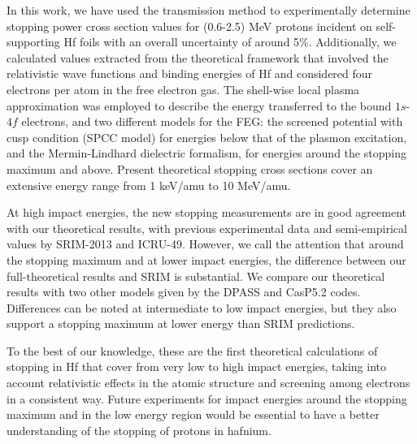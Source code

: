 In this work, we have used the transmission method to experimentally 
determine stopping power cross section values for (0.6-2.5) MeV protons 
incident on self-supporting Hf foils with an overall uncertainty of 
around 5\%. Additionally, we calculated values extracted from the 
theoretical framework that involved the relativistic wave functions and 
binding energies of Hf and considered four electrons per atom in the 
free electron gas. The shell-wise local plasma approximation was 
employed to describe the energy transferred to the bound $1s$-$4f$ 
electrons, and two different models for the FEG: the screened potential 
with cusp condition (SPCC model) for energies below that of the plasmon 
excitation, and the Mermin-Lindhard dielectric formalism, for energies 
around the stopping maximum and above. Present theoretical stopping 
cross sections cover an extensive energy range from 1 keV/amu to 
10 MeV/amu.

At high impact energies, the new stopping  measurements are in good 
agreement with our theoretical results, with previous experimental data
and semi-empirical values by SRIM-2013 and ICRU-49.  However, we call 
the attention that around the stopping maximum and at lower impact 
energies, the difference between our full-theoretical results and SRIM 
is substantial. We compare our theoretical results with two other models 
given by the DPASS and CasP5.2 codes. Differences can be noted at 
intermediate to low impact energies, but they also support a stopping 
maximum at lower energy than SRIM predictions. 

To the best of our knowledge, these are the first theoretical 
calculations of stopping in Hf that cover from very low to high impact energies, taking into account relativistic effects in the atomic structure and screening among electrons in a consistent 
way. Future experiments for 
impact energies around the stopping maximum and in the low energy region 
would be essential to have a better understanding of the stopping of 
protons in hafnium.




